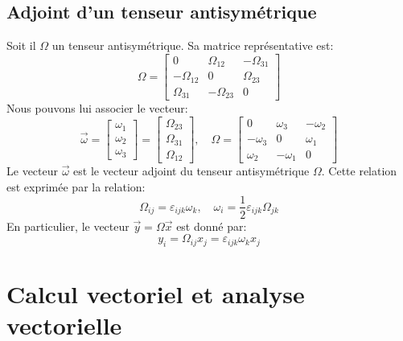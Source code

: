 \subsection{Adjoint d'un tenseur antisymétrique}
Soit il $\mathbb{\Omega}$ un tenseur antisymétrique.
Sa matrice représentative est:
\begin{equation}
    \mathbb{\Omega} = 
    \begin{bmatrix}
        0 & \Omega_{12} & -\Omega_{31} \\
        -\Omega_{12} & 0 & \Omega_{23} \\
        \Omega_{31} & -\Omega_{23} & 0
    \end{bmatrix}
    \label{eq:AnnA-046}
\end{equation}
Nous pouvons lui associer le vecteur:
\begin{equation}
    \vec{\omega} = 
    \begin{bmatrix}
        \omega_1 \\
        \omega_2 \\
        \omega_3
    \end{bmatrix} =
    \begin{bmatrix}
        \Omega_{23} \\
        \Omega_{31} \\
        \Omega_{12}
    \end{bmatrix}, \quad
    \mathbb{\Omega} = 
    \begin{bmatrix}
        0 & \omega_3 &-\omega_2 \\
        -\omega_3 & 0 & \omega_1 \\
        \omega_2 & -\omega_1 & 0
    \end{bmatrix}
    \label{eq:AnnA-047}
\end{equation}
Le vecteur $\vec{\omega}$ est le vecteur adjoint du tenseur antisymétrique $\mathbb{\Omega}$.
Cette relation est exprimée par la relation:
\begin{equation}
        \Omega_{ij} = \varepsilon_{ijk} \omega_{k} ,\quad
        \omega_i = \frac{1}{2} \varepsilon_{ijk} \Omega_{jk}
    \label{eq:AnnA-048}
\end{equation}
En particulier, le vecteur $\vec{y} = \mathbb{\Omega} \vec{x}$ est donné par:
\begin{equation}
    y_i = \Omega_{ij} x_j = \varepsilon_{ijk} \omega_k x_j
    \label{eq:AnnA-049}
\end{equation}
\section{Calcul vectoriel et analyse vectorielle}
